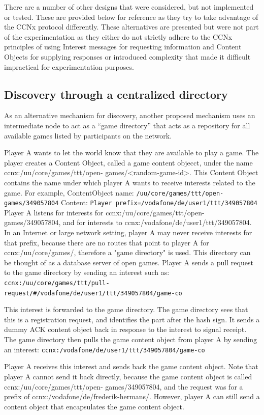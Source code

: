 \documentclass[a4paper,12pt]{report}      %
\begin{document}
There are a number of other designs that were considered, but not implemented or tested. These are
provided below for reference as they try to take advantage of the CCNx protocol differently. These
alternatives are presented but were not part of the experimentation as they either do not strictly adhere
to the CCNx principles of using Interest messages for requesting information and Content Objects for
supplying responses or introduced complexity that made it difficult impractical for experimentation
purposes.

\subsection{Discovery through a centralized directory}

As an alternative mechanism for discovery, another proposed mechanism uses an intermediate node to
act as a “game directory” that acts as a repository for all available games listed by participants on the
network.

Player A wants to let the world know that they are available to play a game. The player creates a
Content Object, called a game content objecct, under the name ccnx:/uu/core/games/ttt/open-
games/<random-game-id>. This Content Object contains the name under which player A wants to
receive interests related to the game. For example,
ContentObject name: \verb!/uu/core/games/ttt/open-games/349057804!
Content: \verb!Player prefix=/vodafone/de/user1/ttt/349057804!
Player A listens for interests for ccnx:/uu/core/games/ttt/open-games/349057804, and for interests to
ccnx:/vodafone/de/user1/ttt/349057804. In an Internet or large network setting, player A may never
receive interests for that prefix, because there are no routes that point to player A for
ccnx:/uu/core/games/, therefore a "game directory" is used. This directory can be thought of as a
database server of open games. Player A sends a pull request to the game directory by sending an
interest such as:
\verb!ccnx:/uu/core/games/ttt/pull-request/#/vodafone/de/user1/ttt/349057804/game-co!

This interest is forwarded to the game directory. The game directory sees that this is a registration
request, and identifies the part after the hash sign. It sends a dummy ACK content object back in
response to the interest to signal receipt. The game directory then pulls the game content object from
player A by sending an interest: \verb!ccnx:/vodafone/de/user1/ttt/349057804/game-co!

Player A receives this interest and sends back the game content object. Note that player A cannot send it
back directly, because the game content object is called ccnx:/uu/core/games/ttt/open-
games/349057804, and the request was for a prefix of ccnx:/vodafone/de/frederik-hermans/.
However, player A can still send a content object that encapsulates the game content object.
\end{document}
